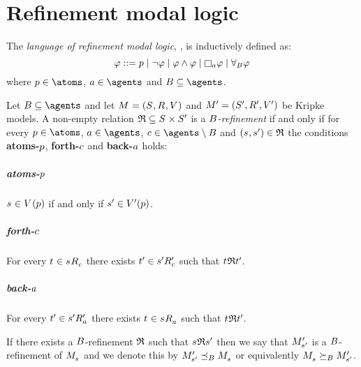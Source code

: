 \chapter{Refinement modal logic}\label{rml}

\begin{definition}
The {\em language of refinement modal logic}, \langRml{}, is inductively defined as:
$$
\phi ::= 
    \atomP \mid
    \lnot \phi \mid
    \phi \land \phi \mid
    \necessaryA \phi \mid
    \allrefsBs \phi
$$
where $\atomP \in \atoms$, $\agentA \in \agents$ and $\agentsB \subseteq \agents$.
\end{definition}

\begin{definition}
Let $\agentsB \subseteq \agents$ and let $\kModelAndTuple$ and $\kModelAndTupleP$ be Kripke models.
A non-empty relation $\refinement \subseteq \kStates \times \kStatesP$ is a {\em $B$-refinement} if and only if for every $\atomP \in \atoms$, $\agentA \in \agents$, $\agentC \in \agents \setminus \agentsB$ and $(\kStateS, \kStateSP) \in \refinement$ the conditions {\bf atoms-$p$}, {\bf forth-$c$} and {\bf back-$a$} holds:

\paragraph{atoms-$p$}
$\kStateS \in \kValuation(\atomP)$ if and only if ${{s}^{\prime}} \in {V^{\prime}}(p)$.

\paragraph{forth-$c$}
For every $\kStateT \in \kSuccessorsC{\kStateS}$ there exists ${{t}^{\prime}} \in {{{s}^{\prime}}} {R^{\prime}_{c}}$ such that $\kStateT \refinement \kStateTP$.

\paragraph{back-$a$}
For every ${{t}^{\prime}} \in {{{s}^{\prime}}} {R^{\prime}_{a}}$ there exists $\kStateT \in \kSuccessorsA{\kStateS}$ such that $\kStateT \refinement \kStateTP$.

If there exists a $B$-refinement $\mathfrak{R}$ such that $\kStateS \refinement \kStateSP$ then we say that ${M^{\prime}_{{{s}^{\prime}}}}$ is a $B$-refinement of $\kPModel{\kStateS}$ and we denote this by $\kPModelP{\kStateSP} \refinesBs \kPModel{\kStateS}$ or equivalently $\kPModel{\kStateS} \simulatesBs \kPModelP{\kStateSP}$.
\end{definition}

